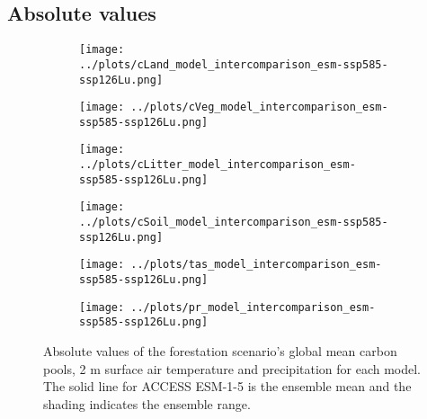 \documentclass[]{article}
\begin{document}
\subsection{Absolute values}

\begin{figure}[H]
    \centering
    \begin{subfigure}[b]{0.45\linewidth}
        \texttt{[image: ../plots/cLand\_model\_intercomparison\_esm-ssp585-ssp126Lu.png]}
    \end{subfigure}
    \begin{subfigure}[b]{0.45\linewidth}
        \texttt{[image: ../plots/cVeg\_model\_intercomparison\_esm-ssp585-ssp126Lu.png]}
    \end{subfigure}
    \begin{subfigure}[b]{0.45\linewidth}
        \texttt{[image: ../plots/cLitter\_model\_intercomparison\_esm-ssp585-ssp126Lu.png]}
    \end{subfigure}
    \begin{subfigure}[b]{0.45\linewidth}
        \texttt{[image: ../plots/cSoil\_model\_intercomparison\_esm-ssp585-ssp126Lu.png]}
    \end{subfigure}
    \begin{subfigure}[b]{0.45\linewidth}
        \texttt{[image: ../plots/tas\_model\_intercomparison\_esm-ssp585-ssp126Lu.png]}
    \end{subfigure}
    \begin{subfigure}[b]{0.45\linewidth}
        \texttt{[image: ../plots/pr\_model\_intercomparison\_esm-ssp585-ssp126Lu.png]}
    \end{subfigure}
    \caption{Absolute values of the forestation scenario's global mean carbon pools, 2 m surface air temperature and precipitation for each model. The solid line for ACCESS ESM-1-5 is the ensemble mean and the shading indicates the ensemble range.}
    \label{fig:models_absolute}
\end{figure}
\end{document}
